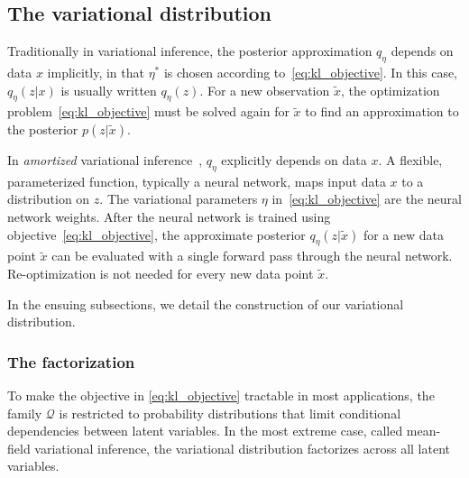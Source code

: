 \subsection{The variational distribution}
\label{sec:var_distr}
Traditionally in variational inference, the posterior approximation 
$q_\eta$ depends on data $x$ implicitly, 
in that $\eta^*$ is chosen according to~\eqref{eq:kl_objective}. In this case, $q_\eta(z | x)$ is usually written $q_\eta(z)$. For a new observation $\tilde x$, the optimization problem~\eqref{eq:kl_objective} must be solved again for $\tilde x$ to find an 
approximation to the posterior $p(z | \tilde x)$. 

In {\itshape amortized} variational
inference~\cite{kingma2013autoencoding, rezende2014stochastic}, $q_\eta$ explicitly depends on data $x$. A flexible, parameterized function, typically a neural network, maps input data $x$ to
a distribution on $z$. 
The variational parameters $\eta$ in~\eqref{eq:kl_objective} 
are the neural network weights. 
After the neural network is trained using 
objective~\eqref{eq:kl_objective}, the 
approximate posterior $q_\eta(z | \tilde x)$ for a new data point 
$\tilde x$ can be evaluated with a single forward pass through the neural network. 
Re-optimization is not needed for every new data point $\tilde x$. 

In the ensuing subsections, we detail the construction of our variational distribution. 

\subsubsection{The factorization}
\label{sec:factorization}
To make the objective in \eqref{eq:kl_objective} tractable in most 
applications, the family $\mathcal{Q}$ is restricted to probability distributions 
that limit conditional dependencies between latent variables. In the most extreme case, called mean-field variational inference, the variational distribution factorizes across all latent variables. 

